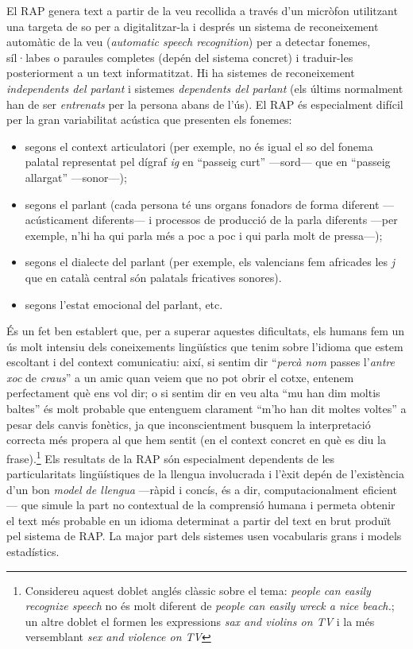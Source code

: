 El RAP genera text a partir de la veu recollida a través d'un micròfon
utilitzant una targeta de so per a digitalitzar-la i després un
sistema de reconeixement automàtic de la veu (\emph{automatic
  speech recognition}) per a detectar fonemes, síl·labes o paraules
completes (depén del sistema concret) i traduir-les posteriorment
a un text informatitzat.  Hi ha sistemes de reconeixement {\em
  independents del parlant} i sistemes \emph{dependents del parlant}
(els últims normalment han de ser \emph{entrenats} per la persona abans
de l'ús).  El RAP és especialment difícil per la gran variabilitat
acústica que presenten els fonemes:
\begin{itemize}
\item segons el context articulatori (per exemple, no és igual el so del
fonema palatal representat pel dígraf \emph{ig}
en ``passeig curt'' ---sord--- que en ``passeig allargat''
---sonor---);
\item segons el parlant (cada persona té uns organs fonadors de forma
  diferent ---acústicament diferents---
  i processos de producció de la parla diferents ---per exemple, n'hi
  ha qui parla més a poc a poc i qui parla molt de pressa---);
\item segons el dialecte del parlant (per exemple, els valencians fem
  africades les \emph{j} que en català central són palatals fricatives
  sonores).
\item segons l'estat emocional del parlant, etc.
\end{itemize}
És un fet ben establert que, per a superar aquestes dificultats, els
humans fem un ús molt intensiu dels coneixements lingüístics que tenim
sobre l'idioma que estem escoltant i del context comunicatiu: així, si
sentim dir ``\emph{percà nom} passes l'\emph{antre xoc} de
\emph{craus}'' a un amic quan veiem que no pot obrir el cotxe, entenem
perfectament què ens vol dir; o si sentim dir en veu alta ``mu han dim
moltis baltes'' és molt probable que entenguem clarament ``m'ho han
dit moltes voltes'' a pesar dels canvis fonètics, ja que
inconscientment busquem la interpretació correcta més propera al que
hem sentit (en el context concret en què es diu la
frase).\footnote{Considereu aquest doblet anglés clàssic sobre el tema:
  \emph{people can easily recognize speech} no és molt diferent de
  {\em people can easily wreck a nice beach.}; un altre doblet el
  formen les expressions \emph{sax and violins on TV} i la més
  versemblant \emph{sex and violence on TV}} Els resultats de la RAP
són especialment dependents de les particularitats lingüístiques de la
llengua involucrada i l'èxit depén de l'existència d'un bon
\emph{model de llengua} ---ràpid i concís, és a dir, computacionalment
eficient--- que simule la part no contextual de la comprensió humana i
permeta obtenir el text més probable en un idioma determinat a partir
del text en brut produït pel sistema de RAP. La major part dels
sistemes usen vocabularis grans i models estadístics.



